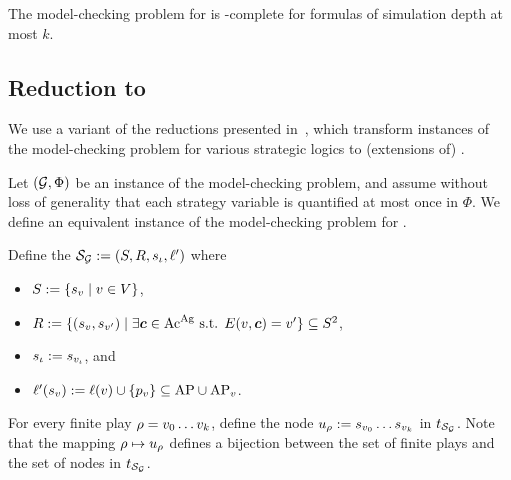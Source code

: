 \begin{theorem}
  \label{theo-qctls}
  The model-checking problem for \QCTLs is \kEXPTIME[(k+1)]-complete for
  formulas of simulation depth at most $k$.
\end{theorem}

\subsection{Reduction to \QCTLs}
\label{sec-reduction}

We use a variant of the reductions presented
in~\cite{DBLP:journals/iandc/LaroussinieM15,DBLP:conf/csl/FijalkowMMR18,BMMRV17,DBLP:conf/kr/MaubertM18,DBLP:conf/ijcai/BouyerKMMMP19},
which transform instances of the model-checking problem for various
strategic logics to (extensions of) \QCTLs.

Let $(\CGS,\Phi)$ be an instance of the \SL
model-checking problem, and assume without loss of generality that
each strategy variable is quantified at most once in $\Phi$. We define an equivalent instance of the
model-checking problem for \QCTLs.


Define the \KS $\KS_{\CGS}\egdef(\setstates,\relation,\sstate_{\init},\lab')$ where
\begin{itemize}
\item $S:=\{s_{v} \mid v\in V\}$,
\item $R:=\{(s_{v},s_{v'})\mid
  \exists\bm{c}\in\textnormal{Ac}^{\textnormal{Ag}} \mbox{ s.t. }E(v,\bm{c})=v'\}
  \subseteq S^2$,
  \item $s_{{\iota}}:=s_{v_{{\iota}}}$, and
\item $\ell'(s_{v}):=\ell(v)\cup \{p_{v}\} \subseteq \textnormal{AP} \cup \textnormal{AP}_{v}$.
\end{itemize}



For every finite play $\rho=v_{0}\ldots v_{k}$, define
the node $u_{\rho}:= s_{v_{0}}\ldots s_{v_{k}}$ in
$\unfold[\KS_{\CGS}]{\sstate_{\pos_{0}}}$.  Note that the mapping
$\rho\mapsto u_{\rho}$ defines a bijection between the set
of finite plays and the set of
nodes in $\unfold[\KS_{\CGS}]{\sstate_{\init}}$. %


